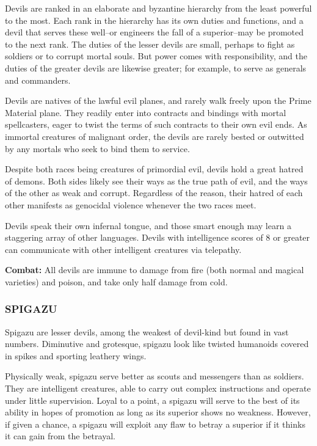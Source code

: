 \begin{multicols}{2}
Devils are ranked in an elaborate and byzantine hierarchy from the least powerful to the most. Each rank in the hierarchy has its own duties and functions, and a devil that serves these well--or engineers the fall of a superior--may be promoted to the next rank. The duties of the lesser devils are small, perhaps to fight as soldiers or to corrupt mortal souls. But power comes with responsibility, and the duties of the greater devils are likewise greater; for example, to serve as generals and commanders.

Devils are natives of the lawful evil planes, and rarely walk freely upon the Prime Material plane. They readily enter into contracts and bindings with mortal spellcasters, eager to twist the terms of such contracts to their own evil ends. As immortal creatures of malignant order, the devils are rarely bested or outwitted by any mortals who seek to bind them to service.

Despite both races being creatures of primordial evil, devils hold a great hatred of demons. Both sides likely see their ways as the true path of evil, and the ways of the other as weak and corrupt. Regardless of the reason, their hatred of each other manifests as genocidal violence whenever the two races meet.

Devils speak their own infernal tongue, and those smart enough may learn a staggering array of other languages. Devils with intelligence scores of 8 or greater can communicate with other intelligent creatures via telepathy.

\textbf{Combat:} All devils are immune to damage from fire (both normal and magical varieties) and poison, and take only half damage from cold.

\subsubsection{SPIGAZU}

Spigazu are lesser devils, among the weakest of devil-kind but found in vast numbers. Diminutive and grotesque, spigazu look like twisted humanoids covered in spikes and sporting leathery wings.

Physically weak, spigazu serve better as scouts and messengers than as soldiers. They are intelligent creatures, able to carry out complex instructions and operate under little supervision. Loyal to a point, a spigazu will serve to the best of its ability in hopes of promotion as long as its superior shows no weakness. However, if given a chance, a spigazu will exploit any flaw to betray a superior if it thinks it can gain from the betrayal.


\end{multicols}
